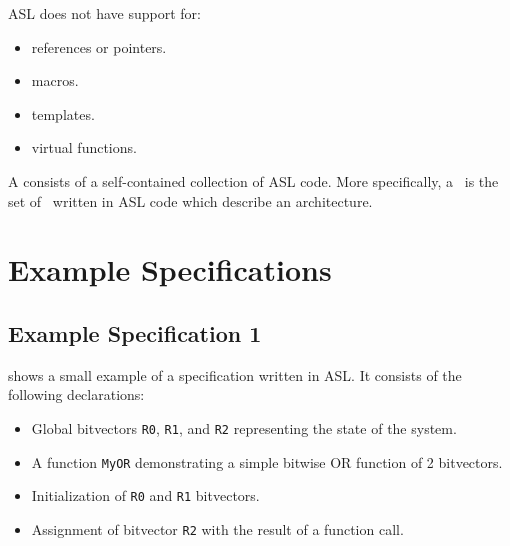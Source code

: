 ASL does not have support for:
\begin{itemize}
    \item references or pointers.
    \item macros.
    \item templates.
    \item virtual functions.
\end{itemize}

A \emph{\specificationterm} consists of a self-contained collection of ASL code.
More specifically, a \specificationterm\ is the set of \globaldeclarationsterm\
written in ASL code which describe an architecture.

\section{Example Specifications}

\subsection{Example Specification 1}
 shows a small example of a specification written in ASL. It consists of the following declarations:
\begin{itemize}
    \item Global bitvectors \texttt{R0}, \texttt{R1}, and \texttt{R2} representing the state of the system.
    \item A function \texttt{MyOR} demonstrating a simple bitwise OR function of 2 bitvectors.
    \item Initialization of \texttt{R0} and \texttt{R1} bitvectors.
    \item Assignment of bitvector \texttt{R2} with the result of a function call.
\end{itemize}

\begin{center}

\end{center}

